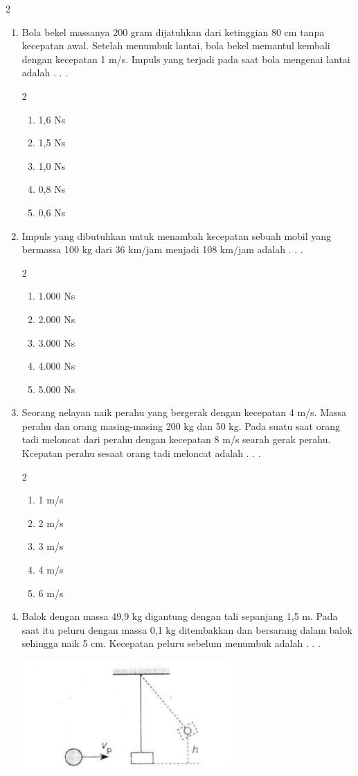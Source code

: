 \documentclass[10pt,a4paper]{extarticle}
\newcommand{\pilgani}[1]{                            \vspace{-0.3cm}\begin{multicols}{2}
 \begin{enumerate}[label=\Alph*., itemsep=0pt,topsep=0pt,leftmargin=*,align=Center]#1                     \end{enumerate}
 \phantom{ini cuma sapi, wedus, dan ayam}
 \end{multicols}}
\begin{document}
\begin{multicols*}{2}
\begin{enumerate}
\vspace{2cm}



\item Bola bekel massanya 200 gram dijatuhkan dari ketinggian 80 cm tanpa kecepatan awal. Setelah menumbuk lantai, bola bekel memantul kembali dengan kecepatan 1 m/s. Impuls yang terjadi pada saat bola mengenai lantai adalah . . . 
\pilgani{
        \item 1,6 Ns
        \item 1,5 Ns
        \item 1,0 Ns
        \item 0,8 Ns
        \item 0,6 Ns
        }
\vspace{2cm}


\item Impuls yang dibutuhkan untuk menambah kecepatan sebuah mobil yang bermassa 100 kg dari 36 km/jam menjadi 108 km/jam adalah . . .
\pilgani{
        \item 1.000 Ns
        \item 2.000 Ns
        \item 3.000 Ns
        \item 4.000 Ns
        \item 5.000 Ns
        }
\vspace{2cm}


\item Seorang nelayan naik perahu yang bergerak dengan kecepatan 4 m/s. Massa perahu dan orang masing-masing 200 kg dan 50 kg. Pada suatu saat orang tadi meloncat dari perahu dengan kecepatan 8 m/s searah gerak perahu. Kcepatan perahu sesaat orang tadi meloncat adalah . . .
\pilgani{
        \item 1 m/s
        \item 2 m/s
        \item 3 m/s
        \item 4 m/s
        \item 6 m/s
        }
\vspace{5cm}

\item Balok dengan massa 49,9 kg digantung dengan tali sepanjang 1,5 m. Pada saat itu peluru dengan massa 0,1 kg ditembakkan dan bersarang dalam balok sehingga naik 5 cm. Kecepatan peluru sebelum menumbuk adalah . . .

\includegraphics[width=8cm]{pic/mom3}


\end{enumerate}
\end{multicols*}
\end{document}
